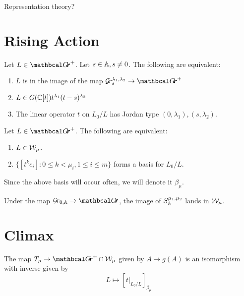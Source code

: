 \documentclass[draft]{article}
\begin{document}

Representation theory? 

\section{Rising Action} %

\begin{lemma} \label{le:Grl1l2}
    Let $ L \in \Grth^+ $.  Let $ s \in \AA, s \ne 0 $.  The following are equivalent:
    \begin{enumerate}
        \item $ L $ is in the image of the map $ \Gr^{\lambda_1, \lambda_2}_s \rightarrow \Grth^+$
        \item $ L \in G(\CC[t]) t^{\lambda_1} (t-s)^{\lambda_2}$
        \item The linear operator $ t $ on $ L_0/L$ has Jordan type $(0,\lambda_1), (s,\lambda_2)$.
    \end{enumerate}
\end{lemma}

\begin{lemma} \label{le:Wmu}
    Let $ L \in \Grth^+$.  The following are equivalent:
    \begin{enumerate}
        \item $ L \in \cW_\mu$.
        \item $ \{ [t^k e_i] : 0 \le k < \mu_i, 1 \le i \le m\}$ forms a basis for $ L_0/L$.
    \end{enumerate}
\end{lemma}

Since the above basis will occur often, we will denote it  $ \beta_\mu$.

\begin{lemma}
    Under the map $ \Grbd \rightarrow \Grth$, the image of $ S^{\mu_1, \mu_2}_\AA$ lands in $ \cW_\mu$.
\end{lemma}

\section{Climax}

\begin{theorem} 
The map $ T_\mu \rightarrow \Grth^+ \cap \cW_\mu $ given by $ A \mapsto g(A) $ is an isomorphism with inverse given by
$$ L \mapsto [t|_{L_0/L} ]_{\beta_\mu}$$
\end{theorem}

\end{document}
